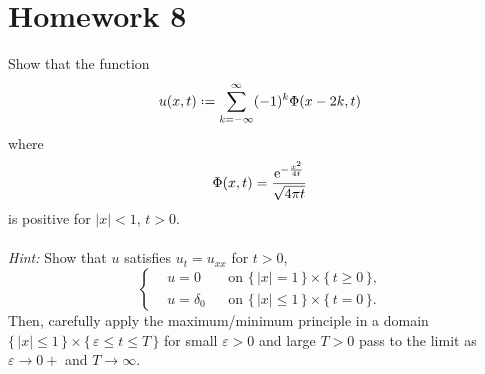 \section{Homework 8}
\begin{problem}
  Show that the function
  \[
    u(x,t)\defeq\sum_{k=-\infty}^\infty (-1)^k\Phi(x-2k,t)
  \]
  where
  \[
    \Phi(x,t)=\frac{\mathrm{e}^{-\frac{x^2}{4t}}}{\sqrt{4\pi t}}
  \]
  is positive for \(|x|<1\), \(t>0\).
  \\\\
  \emph{Hint:} Show that \(u\) satisfies \(u_t=u_{xx}\) for \(t>0\),
  \[
    \left\{
      \begin{aligned}
        &u=0&&\text{on \(\{\,|x|=1\,\}\times\{\,t\geq 0\,\}\),}\\
        &u=\delta_0&&\text{on \(\{\,|x|\leq 1\,\}\times\{\,t=0\,\}\).}
      \end{aligned}
    \right.
  \]
  Then, carefully apply the maximum/minimum principle in a domain
  \(\{\,|x|\leq 1\,\}\times\{\,\varepsilon\leq t\leq T\,\}\) for small
  \(\varepsilon>0\) and large \(T>0\) pass to the limit as
  \(\varepsilon\to 0+\) and \(T\to\infty\).
\end{problem}
